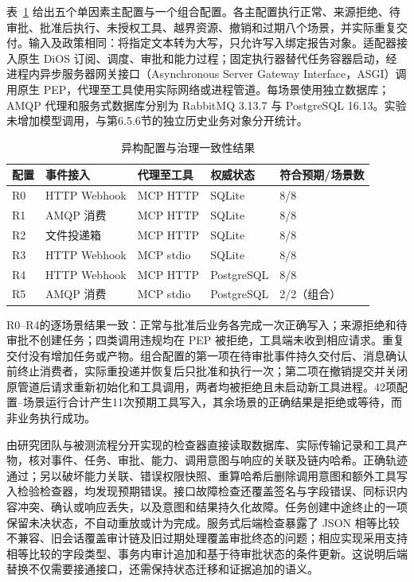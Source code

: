 表~\ref{tab:heterogeneity-rr022} 给出五个单因素主配置与一个组合配置。各主配置执行正常、来源拒绝、待审批、批准后执行、未授权工具、越界资源、撤销和过期八个场景，并实际重复交付。输入及政策相同：将指定文本转为大写，只允许写入绑定报告对象。适配器接入原生 DiOS 订阅、调度、审批和能力过程；固定执行器替代任务容器启动，经进程内异步服务器网关接口（Asynchronous Server Gateway Interface，ASGI）调用原生 PEP，代理至工具使用实际网络或进程管道。每场景使用独立数据库；AMQP 代理和服务式数据库分别为 RabbitMQ 3.13.7 与 PostgreSQL 16.13。实验未增加模型调用，与第6.5.6节的独立历史业务对象分开统计。

\begin{table}[htbp]
\centering
\caption{异构配置与治理一致性结果}
\label{tab:heterogeneity-rr022}
\small
\begin{tabular}{lllll}
\toprule
配置 & 事件接入 & 代理至工具 & 权威状态 & 符合预期/场景数 \\
\midrule
R0 & HTTP Webhook & MCP HTTP & SQLite & 8/8 \\
R1 & AMQP 消费 & MCP HTTP & SQLite & 8/8 \\
R2 & 文件投递箱 & MCP HTTP & SQLite & 8/8 \\
R3 & HTTP Webhook & MCP stdio & SQLite & 8/8 \\
R4 & HTTP Webhook & MCP HTTP & PostgreSQL & 8/8 \\
R5 & AMQP 消费 & MCP stdio & PostgreSQL & 2/2（组合） \\
\bottomrule
\end{tabular}
\end{table}

R0--R4的逐场景结果一致：正常与批准后业务各完成一次正确写入；来源拒绝和待审批不创建任务；四类调用违规均在 PEP 被拒绝，工具端未收到相应请求。重复交付没有增加任务或产物。组合配置的第一项在待审批事件持久交付后、消息确认前终止消费者，实际重投递并恢复后只批准和执行一次；第二项在撤销提交并关闭原管道后请求重新初始化和工具调用，两者均被拒绝且未启动新工具进程。42项配置--场景运行合计产生11次预期工具写入，其余场景的正确结果是拒绝或等待，而非业务执行成功。

由研究团队与被测流程分开实现的检查器直接读取数据库、实际传输记录和工具产物，核对事件、任务、审批、能力、调用意图与响应的关联及链内哈希。正确轨迹通过；另以破坏能力关联、错误权限快照、重算哈希后删除调用意图和额外工具写入检验检查器，均发现预期错误。接口故障检查还覆盖签名与字段错误、同标识内容冲突、确认或响应丢失，以及意图和结果持久化故障。任务创建中途终止的一项保留未决状态，不自动重放或计为完成。服务式后端检查暴露了 JSON 相等比较不兼容、旧会话覆盖审计链及旧过期处理覆盖审批终态的问题；相应实现采用支持相等比较的字段类型、事务内审计追加和基于待审批状态的条件更新。这说明后端替换不仅需要接通接口，还需保持状态迁移和证据追加的语义。

